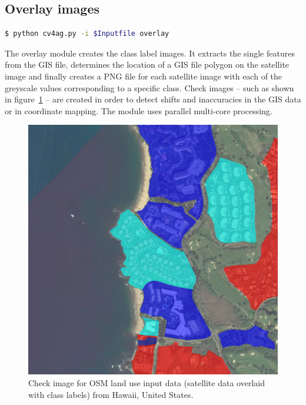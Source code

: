 \documentclass[fleqn,10pt]{SelfArx} %
\begin{document}
\subsection{Overlay images}
\begin{lstlisting}[language=bash]
  $ python cv4ag.py -i $Inputfile overlay
\end{lstlisting}
The overlay module creates the class label images. It extracts the single features from the GIS file, determines the location of a GIS file polygon on the satellite image and finally creates a PNG file for each satellite image with each of the greyscale values corresponding to a specific class. Check images -- such as shown in figure~\ref{fig:results} -- are created in order to detect shifts and inaccuracies in the GIS data or in coordinate mapping. The module uses parallel multi-core processing.
\begin{figure}[ht]\centering
\includegraphics[width=\linewidth]{hawaii}
\caption{Check image for OSM land use input data (satellite data overlaid with class labels) from Hawaii, United States.}
\label{fig:results}
\end{figure}
\end{document}

